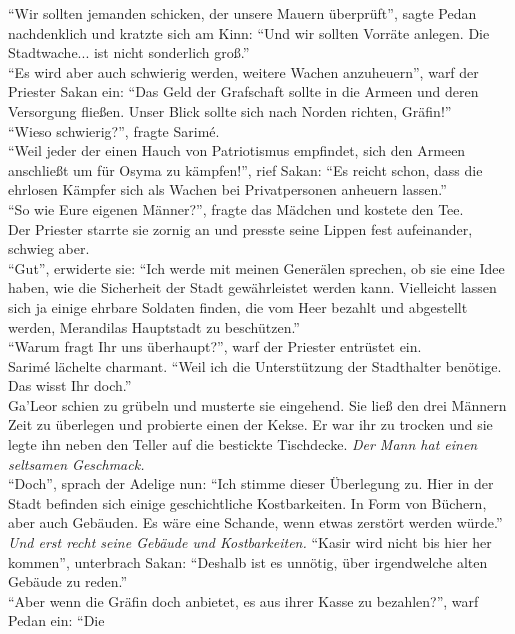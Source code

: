 ``Wir sollten jemanden schicken, der unsere Mauern überprüft'', sagte Pedan nachdenklich und 
kratzte sich am Kinn: ``Und wir sollten Vorräte anlegen. Die Stadtwache... ist nicht sonderlich 
groß.''\\
``Es wird aber auch schwierig werden, weitere Wachen anzuheuern'', warf der Priester Sakan ein: 
``Das Geld der Grafschaft sollte in die Armeen und deren Versorgung fließen. Unser Blick sollte 
sich nach Norden richten, Gräfin!''\\
``Wieso schwierig?'', fragte Sarimé.\\
``Weil jeder der einen Hauch von Patriotismus empfindet, sich den Armeen anschließt um für Osyma zu 
kämpfen!'', rief Sakan: ``Es reicht schon, dass die ehrlosen Kämpfer sich als Wachen bei 
Privatpersonen anheuern lassen.''\\
``So wie Eure eigenen Männer?'', fragte das Mädchen und kostete den Tee.\\
Der Priester starrte sie zornig an und presste seine Lippen fest aufeinander, schwieg aber.\\
``Gut'', erwiderte sie: ``Ich werde mit meinen Generälen sprechen, ob sie eine Idee haben, wie die 
Sicherheit der Stadt gewährleistet werden kann. Vielleicht lassen sich ja einige ehrbare Soldaten 
finden, die vom Heer bezahlt und abgestellt werden, Merandilas Hauptstadt zu beschützen.''\\
``Warum fragt Ihr uns überhaupt?'', warf der Priester entrüstet ein.\\
Sarimé lächelte charmant. ``Weil ich die Unterstützung der Stadthalter benötige. Das wisst Ihr 
doch.''\\
Ga'Leor schien zu grübeln und musterte sie eingehend. Sie ließ den drei Männern Zeit zu überlegen 
und probierte einen der Kekse. Er war ihr zu trocken und sie legte ihn neben den Teller auf die 
bestickte Tischdecke. \textit{Der Mann hat einen seltsamen Geschmack.}\\
``Doch'', sprach der Adelige nun: ``Ich stimme dieser Überlegung zu. Hier in der Stadt befinden 
sich einige geschichtliche Kostbarkeiten. In Form von Büchern, aber auch Gebäuden. Es wäre eine 
Schande, wenn etwas zerstört werden würde.''\\
\textit{Und erst recht seine Gebäude und Kostbarkeiten.}
``Kasir wird nicht bis hier her kommen'', unterbrach Sakan: ``Deshalb ist es unnötig, über 
irgendwelche alten Gebäude zu reden.''\\
``Aber wenn die Gräfin doch anbietet, es aus ihrer Kasse zu bezahlen?'', warf Pedan ein: ``Die 
